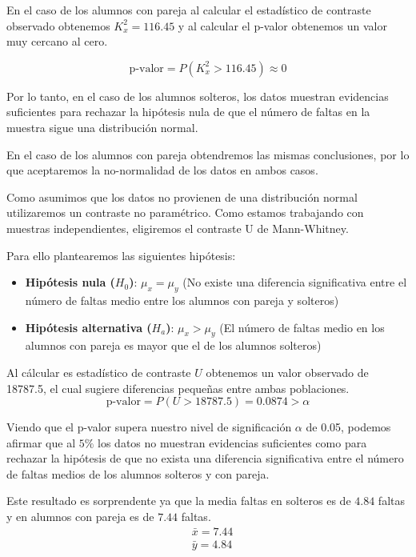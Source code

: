 \pagebreak

En el caso de los alumnos con pareja al calcular el estadístico de contraste observado obtenemos $K^2_x = 116.45$ y al calcular el p-valor obtenemos un valor muy cercano al cero.

\begin{equation*}
    \text{p-valor} = P(K^2_x > 116.45) \approx 0
\end{equation*}

Por lo tanto, en el caso de los alumnos solteros, los datos muestran evidencias suficientes para rechazar la hipótesis nula de que el número de faltas en la muestra sigue una distribución normal.

En el caso de los alumnos con pareja obtendremos las mismas conclusiones, por lo que aceptaremos la no-normalidad de los datos en ambos casos.
\pagebreak

Como asumimos que los datos no provienen de una distribución normal utilizaremos un contraste no paramétrico. Como estamos trabajando con muestras independientes, eligiremos el contraste U de Mann-Whitney.

Para ello plantearemos las siguientes hipótesis:

\begin{itemize}
    \item \textbf{Hipótesis nula ($H_0$)}: $\mu_x = \mu_y$ (No existe una diferencia significativa entre el número de faltas medio entre los alumnos con pareja y solteros)
    \item \textbf{Hipótesis alternativa ($H_a$)}: $\mu_x > \mu_y$ (El número de faltas medio en los alumnos con pareja es mayor que el de los alumnos solteros)
\end{itemize}

Al cálcular es estadístico de contraste $U$ obtenemos un valor observado de 18787.5, el cual sugiere diferencias pequeñas entre ambas poblaciones.
\begin{equation*}
    \text{p-valor} = P(U > 18787.5) = 0.0874 > \alpha 
\end{equation*}

Viendo que el p-valor supera nuestro nivel de significación $\alpha$ de 0.05, podemos afirmar que al $5\%$ los datos no muestran evidencias suficientes como para rechazar la hipótesis de que no exista una diferencia significativa entre el número de faltas medios de los alumnos solteros y con pareja. 

Este resultado es sorprendente ya que la media faltas en solteros es de $4.84$ faltas y en alumnos con pareja es de $7.44$ faltas. 
\begin{equation*}
    \begin{split}
        & \bar{x} = 7.44\\
        & \bar{y} = 4.84
    \end{split}
\end{equation*}

